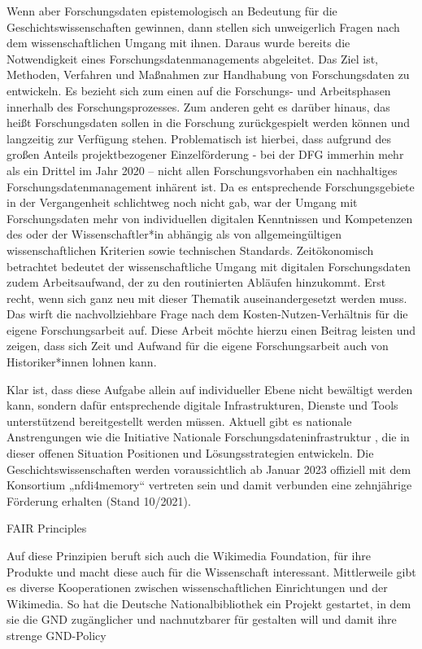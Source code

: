 Wenn aber Forschungsdaten epistemologisch an Bedeutung für die Geschichtswissenschaften gewinnen, dann stellen sich unweigerlich Fragen nach dem wissenschaftlichen Umgang mit ihnen. Daraus wurde bereits die Notwendigkeit eines Forschungsdatenmanagements abgeleitet.  Das Ziel ist, Methoden, Verfahren und Maßnahmen zur Handhabung von Forschungsdaten zu entwickeln. Es bezieht sich zum einen auf die Forschungs- und Arbeitsphasen innerhalb des Forschungsprozesses. Zum anderen geht es darüber hinaus, das heißt Forschungsdaten sollen in die Forschung zurückgespielt werden können und langzeitig zur Verfügung stehen. Problematisch ist hierbei, dass aufgrund des großen Anteils projektbezogener Einzelförderung - bei der DFG immerhin mehr als ein Drittel im Jahr 2020  – nicht allen Forschungsvorhaben ein nachhaltiges Forschungsdatenmanagement inhärent ist. Da es entsprechende Forschungsgebiete in der Vergangenheit schlichtweg noch nicht gab, war der Umgang mit Forschungsdaten mehr von individuellen digitalen Kenntnissen und Kompetenzen des oder der Wissenschaftler*in abhängig als von allgemeingültigen wissenschaftlichen Kriterien sowie technischen Standards. Zeitökonomisch betrachtet bedeutet der wissenschaftliche Umgang mit digitalen Forschungsdaten zudem Arbeitsaufwand, der zu den routinierten Abläufen hinzukommt. Erst recht, wenn sich ganz neu mit dieser Thematik auseinandergesetzt werden muss. Das wirft die nachvollziehbare Frage nach dem Kosten-Nutzen-Verhältnis für die eigene Forschungsarbeit auf. Diese Arbeit möchte hierzu einen Beitrag leisten und zeigen, dass sich Zeit und Aufwand für die eigene Forschungsarbeit auch von Historiker*innen lohnen kann.

Klar ist, dass diese Aufgabe allein auf individueller Ebene nicht bewältigt werden kann, sondern dafür entsprechende digitale Infrastrukturen, Dienste und Tools unterstützend bereitgestellt werden müssen. Aktuell gibt es nationale Anstrengungen wie die Initiative Nationale Forschungsdateninfrastruktur , die in dieser offenen Situation Positionen und Lösungsstrategien entwickeln. Die Geschichtswissenschaften werden voraussichtlich ab Januar 2023 offiziell mit dem Konsortium „nfdi4memory“ vertreten sein und damit verbunden eine zehnjährige Förderung erhalten (Stand 10/2021). 

FAIR Principles

Auf diese Prinzipien beruft sich auch die Wikimedia Foundation, für ihre Produkte und macht diese auch für die Wissenschaft interessant. Mittlerweile gibt es diverse Kooperationen zwischen wissenschaftlichen Einrichtungen und der Wikimedia. So hat die Deutsche Nationalbibliothek ein Projekt gestartet, in dem sie die GND zugänglicher und nachnutzbarer für gestalten will und damit ihre strenge GND-Policy  

